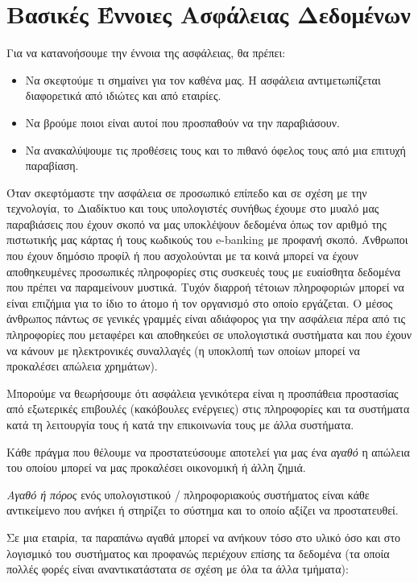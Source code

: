 %
%
\section{Βασικές Έννοιες Ασφάλειας Δεδομένων}

Για να κατανοήσουμε την έννοια της ασφάλειας, θα πρέπει:

\begin{itemize}
\item Να σκεφτούμε τι σημαίνει για τον καθένα μας. Η ασφάλεια αντιμετωπίζεται διαφορετικά από ιδιώτες και από εταιρίες.
\item Να βρούμε ποιοι είναι αυτοί που προσπαθούν να την παραβιάσουν.
\item Να ανακαλύψουμε τις προθέσεις τους και το πιθανό όφελος τους από μια επιτυχή παραβίαση.
\end{itemize}

Όταν σκεφτόμαστε την ασφάλεια σε προσωπικό επίπεδο και σε σχέση με την τεχνολογία, το Διαδίκτυο και τους υπολογιστές συνήθως έχουμε στο μυαλό μας παραβιάσεις που έχουν σκοπό να μας υποκλέψουν δεδομένα όπως τον αριθμό της πιστωτικής μας κάρτας ή τους κωδικούς του e-banking με προφανή σκοπό. Άνθρωποι που έχουν δημόσιο προφίλ ή που ασχολούνται με τα κοινά μπορεί να έχουν αποθηκευμένες προσωπικές πληροφορίες στις συσκευές τους με ευαίσθητα δεδομένα που πρέπει να παραμείνουν μυστικά. Τυχόν διαρροή τέτοιων πληροφοριών μπορεί να είναι επιζήμια για το ίδιο το άτομο ή τον οργανισμό στο οποίο εργάζεται. Ο μέσος άνθρωπος πάντως σε γενικές γραμμές είναι αδιάφορος για την ασφάλεια πέρα από τις πληροφορίες που μεταφέρει και αποθηκεύει σε υπολογιστικά συστήματα και που έχουν να κάνουν με ηλεκτρονικές συναλλαγές (η υποκλοπή των οποίων μπορεί να προκαλέσει απώλεια χρημάτων).

Μπορούμε να θεωρήσουμε ότι ασφάλεια γενικότερα είναι η προσπάθεια προστασίας από εξωτερικές επιβουλές (κακόβουλες ενέργειες) στις πληροφορίες και τα συστήματα κατά τη λειτουργία τους ή κατά την επικοινωνία τους με άλλα συστήματα. 

Κάθε πράγμα που θέλουμε να προστατεύσουμε αποτελεί για μας ένα \emph{αγαθό} η απώλεια του οποίου μπορεί να μας προκαλέσει οικονομική ή άλλη ζημιά. 

\emph{Αγαθό ή πόρος} ενός υπολογιστικού / πληροφοριακούς συστήματος είναι κάθε αντικείμενο που ανήκει ή στηρίζει το σύστημα και το οποίο αξίζει να προστατευθεί.

Σε μια εταιρία, τα παραπάνω αγαθά μπορεί να ανήκουν τόσο στο υλικό όσο και στο λογισμικό του συστήματος και προφανώς περιέχουν επίσης τα δεδομένα (τα οποία πολλές φορές είναι αναντικατάστατα σε σχέση με όλα τα άλλα τμήματα):

